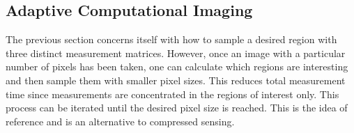 

\subsection{Adaptive Computational Imaging}\label{sec:adp_img}
The previous section concerns itself with how to sample a desired region with three distinct measurement matrices. However, once an image with a particular number of pixels has been taken, one can calculate which regions are interesting and then sample them with smaller pixel sizes. This reduces total measurement time since measurements are concentrated in the regions of interest only. This process can be iterated until the desired pixel size is reached. This is the idea of reference \cite{adp_imaging} and is an alternative to compressed sensing. 

